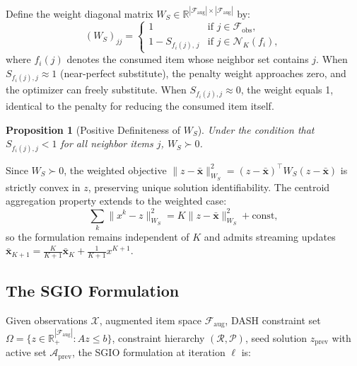 \documentclass[journal]{IEEEtran}
\newtheorem{proposition}{Proposition}
\newcommand{\Faug}{\mathcal{F}_{\mathrm{aug}}}
\newcommand{\Fobs}{\mathcal{F}_{\mathrm{obs}}}
\newcommand{\Nb}{\mathcal{N}}
\newcommand{\bW}{W_S}
\newcommand{\xbar}{\bar{\mathbf{x}}}
\newcommand{\R}{\mathbb{R}}
\newcommand{\cR}{\mathcal{R}}
\newcommand{\cP}{\mathcal{P}}
\newcommand{\cA}{\mathcal{A}}
\begin{document}
Define the weight diagonal matrix $\bW \in \R^{|\Faug| \times |\Faug|}$
by:
\begin{equation}
(\bW)_{jj} =
\begin{cases}
1 & \text{if } j \in \Fobs, \\
1 - S_{f_i(j),\, j} & \text{if } j \in \Nb_K(f_i),
\end{cases}
\label{eq:weights}
\end{equation}
where $f_i(j)$ denotes the consumed item whose neighbor set contains
$j$. When $S_{f_i(j),j} \approx 1$ (near-perfect substitute), the
penalty weight approaches zero, and the optimizer can freely substitute.
When $S_{f_i(j),j} \approx 0$, the weight equals 1, identical to the
penalty for reducing the consumed item itself.

\begin{proposition}[Positive Definiteness of $\bW$]
\label{prop:WSpd}
Under the condition that $S_{f_i(j),j} < 1$ for all neighbor items $j$,
$\bW \succ 0$.
\end{proposition}

Since $\bW \succ 0$, the weighted objective $\|z - \xbar\|_{\bW}^2 =
(z-\xbar)^\top \bW (z-\xbar)$ is strictly convex in $z$, preserving
unique solution identifiability. The centroid aggregation property
extends to the weighted case:
\begin{equation}
\sum_k \|x^k - z\|_{\bW}^2 = K\|z - \xbar\|_{\bW}^2 + \text{const},
\label{eq:aggregation}
\end{equation}
so the formulation remains independent of $K$ and admits streaming
updates $\xbar_{K+1} = \frac{K}{K+1}\xbar_K +
\frac{1}{K+1}x^{K+1}$.

\subsection{The SGIO Formulation}
\label{subsec:smgil_formulation}

Given observations $\mathcal{X}$, augmented item space $\Faug$, DASH
constraint set $\Omega = \{z \in \R^{|\Faug|}_+ : Az \leq b\}$,
constraint hierarchy $(\cR, \cP)$, seed solution $z_{\mathrm{prev}}$
with active set $\cA_{\mathrm{prev}}$, the SGIO formulation at
iteration $\ell$ is:
\end{document}
